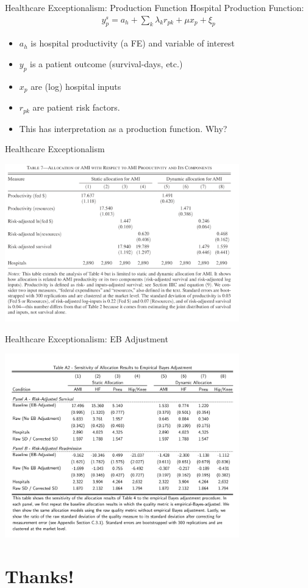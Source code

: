 \documentclass[xcolor=pdftex,dvipsnames,table,mathserif,aspectratio=169]{beamer}
\begin{document}
\begin{frame}{Healthcare Exceptionalism: Production Function}
Hospital Production Function:
\begin{align*}
y_{p}^{s}=a_{h}+\sum_{k} \lambda_{k} r_{p k}+\mu x_{p}+\xi_{p}
\end{align*}
\begin{itemize}
\item $a_h$ is \alert{hospital productivity} (a FE) and variable of interest
\item $y_p$ is a patient outcome (survival-days, etc.)
\item $x_p$ are (log) hospital inputs
\item $r_{pk}$ are patient risk factors.
\item This has interpretation as a \alert{production function}. Why?
\end{itemize}
\end{frame}




\begin{frame}{Healthcare Exceptionalism}
\begin{center}
\includegraphics[width=4in]{./resources/hc7.png}
\end{center}
\end{frame}

\begin{frame}{Healthcare Exceptionalism: EB Adjustment}
\begin{center}
\includegraphics[width=4in]{./resources/hc_a2.png}
\end{center}
\end{frame}


\section*{Thanks!}
\end{document}
